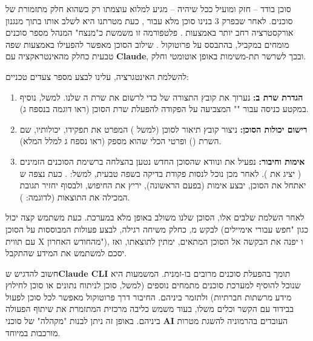 
סוכן בודד – חזק ומועיל ככל שיהיה – מגיע למלוא עוצמתו רק כשהוא חלק מתזמורת של סוכנים. לאחר שבפרק \num{3} בנינו סוכן  מלא עבור , כעת מטרתנו היא לשלב אותו בתוך מנגנון אורקסטרציה רחב יותר באמצעות . פלטפורמה זו משמשת כ"מנצח" המנהל מספר סוכנים מומחים במקביל, בהתבסס על פרוטוקול . שילוב הסוכן מאפשר להפעילו באמצעות שפה טבעית כחלק מהאינטראקציה עם \textbf{Claude}, ובכך לשרשר תת-משימות באופן אוטומטי וחלק.

להשלמת האינטגרציה, עלינו לבצע מספר צעדים טכניים:
\begin{enumerate}
  \item \textbf{הגדרת שרת ב:} נערוך את קובץ התצורה של  כדי לרשום את שרת ה שלנו. למשל, נוסיף במקטע  כניסה עבור "" המצביעה על הפקודה להפעלת שרת הסוכן (ראו דוגמה בנספח ג).
  \item \textbf{רישום יכולות הסוכן:} ניצור קובץ תיאור לסוכן (למשל ) המפרט את תפקידו, יכולותיו, שם השרת () ופרטי הכלי שהוא מספק (ראו נספח ג למלל המלא).
  \item \textbf{אימות וחיבור:} נפעיל את  ונוודא שהסוכן החדש נטען בהצלחה ברשימת הסוכנים הזמינים ( יציג את ). לאחר מכן נוכל לנסות פקודת בדיקה בשפה טבעית, למשל: . כעת נצפה ש יאתחל את הסוכן, יבצע אימות  (בפעם הראשונה), יריץ את החיפוש, ולבסוף יחזיר תגובת  המכילה את התוצאות (לדוגמה: ).
\end{enumerate}

לאחר השלמת שלבים אלו, הסוכן שלנו משולב באופן מלא במערכת. כעת משתמש קצה יכול לבקש מ, כחלק משיחה רגילה, לבצע פעולות המבוססות על הסוכן (כגון "חפש עבורי אימיילים עם תווית X מהחודש האחרון"), ו יפנה את הבקשה אל הסוכן המתאים, ימתין לתוצאתו, ואז יסכם למשתמש את המידע שהתקבל.

חשוב להדגיש ש\textbf{Claude CLI} תומך בהפעלת סוכנים מרובים בו-זמנית. המשמעות היא שנוכל להוסיף למערכת סוכנים מתמחים נוספים (למשל, סוכן לניתוח נתונים או סוכן לחילוץ מידע מרשתות חברתיות) ולתזמר ביניהם. החיבור דרך פרוטוקול  מאפשר לכל סוכן לפעול בבידוד עם הקשר וכלים משלו, בעוד  משמש כליבה מרכזית המתזמרת את שיתוף הפעולה ביניהם\cite{Anthropic2025}. באופן זה ניתן לבנות "מקהלה" של סוכני \textbf{AI} העובדים בהרמוניה להשגת מטרות מורכבות במיוחד.

